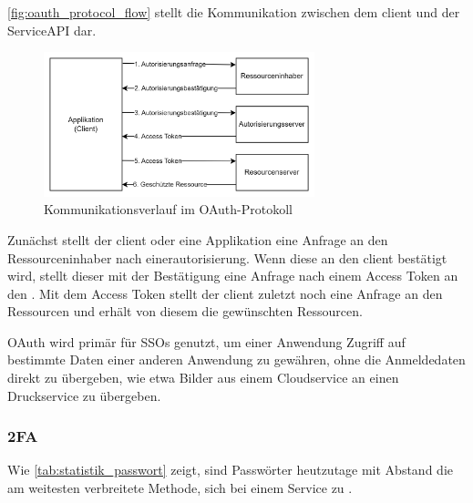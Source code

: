 \autoref{fig:oauth_protocol_flow}\autocite[\vglf][, Abbildung 1]{rfc6749}  stellt die Kommunikation zwischen dem \gls{client} und der Service\nobreakdash\ac{API} dar. 
\begin{figure}[htbp]
    \centering
    \includegraphics[width=0.7\textwidth]{abbildungen/OAuth_abstract_flow.png}
    \caption[Kommunikationsverlauf im OAuth-Protokoll]{Kommunikationsverlauf im OAuth-Protokoll\footnotemark}
    \label{fig:oauth_protocol_flow}
\end{figure}
Zunächst stellt der \gls{client} oder eine Applikation eine Anfrage an den Ressourceninhaber  nach einer\gls{autorisierung}. Wenn diese an den \gls{client} bestätigt wird, stellt dieser mit der Bestätigung eine Anfrage nach einem Access Token an den . Mit dem Access Token stellt der \gls{client} zuletzt noch eine Anfrage an den Ressourcen und erhält von diesem die gewünschten Ressourcen.

OAuth wird primär für \acp{SSO} genutzt, um \zbol einer Anwendung Zugriff auf bestimmte Daten einer anderen Anwendung zu gewähren, ohne die Anmeldedaten direkt zu übergeben, wie etwa Bilder aus einem Cloudservice an einen Druckservice zu übergeben.\autocite[\vglf][]{OAuthWebProtocol:2012}

\subsubsection[2-Factor Authentifizierung]{\acf{2FA}}\label{subsubsec:2fa}
Wie \autoref{tab:statistik_passwort}\autocite{statista_authentifizierung} zeigt, sind Passwörter heutzutage mit Abstand die am weitesten verbreitete Methode, sich bei einem Service zu .

